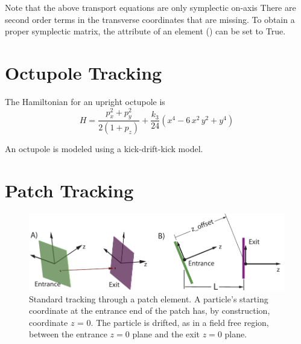 Note that the above transport equations are only symplectic on-axis There are second order terms in
the transverse coordinates that are missing. To obtain a proper symplectic matrix, the
 attribute of an  element () can be set to True.

\section{Octupole Tracking}
\label{s:octupole.std}

The Hamiltonian for an upright octupole is
\begin{equation}
  H = \frac{p_x^2 + p_y^2}{2 (1 + p_z)} + \frac{k_3}{24} (x^4 - 6 \, x^2 \, y^2 + y^4)
\end{equation}

An octupole is modeled using a kick-drift-kick model.

\section{Patch Tracking}
\label{s:patch.std}

\begin{figure}[tb]
  \centering
  \includegraphics[width=5in]{patch.pdf}
  \caption[Standard patch transformation.]
{Standard tracking through a patch element. A particle's starting coordinate at the entrance end of
the patch has, by construction, coordinate $z$ = 0. The particle is drifted, as in a field free
region, between the entrance $z = 0$ plane and the exit $z = 0$ plane.}
  \label{f:patch.track}
\end{figure}


